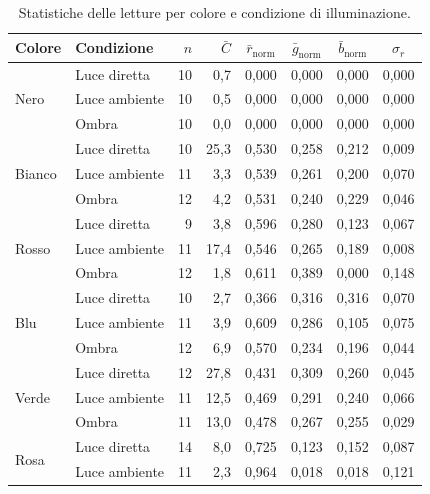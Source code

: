 \documentclass[11pt,a4paper,twoside,openany]{report}
\begin{document}
\begin{table}[htbp]
\centering
\caption{Statistiche delle letture per colore e condizione di illuminazione.}
\label{tab:misure}
\footnotesize
\begin{tabular}{@{}llrrcccc@{}}
\toprule
\textbf{Colore} & \textbf{Condizione} & $n$ & $\bar{C}$ & $\bar{r}_{\mathrm{norm}}$ & $\bar{g}_{\mathrm{norm}}$ & $\bar{b}_{\mathrm{norm}}$ & $\sigma_r$ \\
\midrule
\multirow{3}{*}{Nero}   & Luce diretta  & 10 & 0,7  & 0,000 & 0,000 & 0,000 & 0,000 \\
                        & Luce ambiente & 10 & 0,5  & 0,000 & 0,000 & 0,000 & 0,000 \\
                        & Ombra         & 10 & 0,0  & 0,000 & 0,000 & 0,000 & 0,000 \\
\midrule
\multirow{3}{*}{Bianco} & Luce diretta  & 10 & 25,3 & 0,530 & 0,258 & 0,212 & 0,009 \\
                        & Luce ambiente & 11 & 3,3  & 0,539 & 0,261 & 0,200 & 0,070 \\
                        & Ombra         & 12 & 4,2  & 0,531 & 0,240 & 0,229 & 0,046 \\
\midrule
\multirow{3}{*}{Rosso}  & Luce diretta  & 9  & 3,8  & 0,596 & 0,280 & 0,123 & 0,067 \\
                        & Luce ambiente & 11 & 17,4 & 0,546 & 0,265 & 0,189 & 0,008 \\
                        & Ombra         & 12 & 1,8  & 0,611 & 0,389 & 0,000 & 0,148 \\
\midrule
\multirow{3}{*}{Blu}    & Luce diretta  & 10 & 2,7  & 0,366 & 0,316 & 0,316 & 0,070 \\
                        & Luce ambiente & 11 & 3,9  & 0,609 & 0,286 & 0,105 & 0,075 \\
                        & Ombra         & 12 & 6,9  & 0,570 & 0,234 & 0,196 & 0,044 \\
\midrule
\multirow{3}{*}{Verde}  & Luce diretta  & 12 & 27,8 & 0,431 & 0,309 & 0,260 & 0,045 \\
                        & Luce ambiente & 11 & 12,5 & 0,469 & 0,291 & 0,240 & 0,066 \\
                        & Ombra         & 11 & 13,0 & 0,478 & 0,267 & 0,255 & 0,029 \\
\midrule
\multirow{3}{*}{Rosa}   & Luce diretta  & 14 & 8,0  & 0,725 & 0,123 & 0,152 & 0,087 \\
                        & Luce ambiente & 11 & 2,3  & 0,964 & 0,018 & 0,018 & 0,121 \\

\end{tabular}
\end{table}
\end{document}
